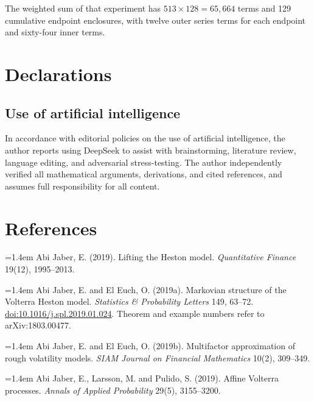\documentclass[11pt,a4paper]{article}
\begin{document}
The weighted sum of that experiment has \(513\times128=65{,}664\) terms and 129 cumulative endpoint enclosures, with twelve outer series terms for each endpoint and sixty-four inner terms.

\section*{Declarations}

\subsection*{Use of artificial intelligence}

In accordance with editorial policies on the use of artificial intelligence, the author reports using DeepSeek to assist with brainstorming, literature review, language editing, and adversarial stress-testing. The author independently verified all mathematical arguments, derivations, and cited references, and assumes full responsibility for all content.

\section*{References}
\begingroup\small\setlength{\parindent}{0pt}\setlength{\parskip}{3pt}\raggedright

\hangindent=1.4em Abi Jaber, E. (2019). Lifting the Heston model. \emph{Quantitative Finance} 19(12), 1995–2013.\par

\hangindent=1.4em Abi Jaber, E. and El Euch, O. (2019a). Markovian structure of the Volterra Heston model. \emph{Statistics \& Probability Letters} 149, 63–72. \href{https://doi.org/10.1016/j.spl.2019.01.024}{doi:10.1016/j.spl.2019.01.024}. Theorem and example numbers refer to arXiv:1803.00477.\par

\hangindent=1.4em Abi Jaber, E. and El Euch, O. (2019b). Multifactor approximation of rough volatility models. \emph{SIAM Journal on Financial Mathematics} 10(2), 309–349.\par

\hangindent=1.4em Abi Jaber, E., Larsson, M. and Pulido, S. (2019). Affine Volterra processes. \emph{Annals of Applied Probability} 29(5), 3155–3200.\par
\end{document}
